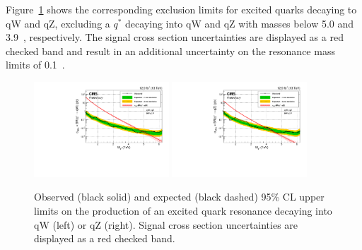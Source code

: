 \noindent Figure~\ref{fig:searchII:limitCombined_qV} shows the corresponding exclusion limits for excited quarks decaying to qW and qZ, excluding a $q^*$ decaying into qW and qZ with masses below 5.0 and 3.9~\TeV, respectively. The signal cross section uncertainties are displayed as a red checked band and result in an additional uncertainty on the resonance mass limits of 0.1~\TeV.
\begin{figure}[h!]
\centering
     \includegraphics[width=0.45\textwidth]{figures/analysis/search2/B2G-16-021/figures/limits/brazilianFlag_qW_new_combined_13TeV.pdf}
     \includegraphics[width=0.45\textwidth]{figures/analysis/search2/B2G-16-021/figures/limits/brazilianFlag_qZ_new_combined_13TeV.pdf}\\
\caption{Observed (black solid) and expected (black dashed) 95\% CL upper limits on the production of an excited quark resonance
decaying into qW (left) or qZ (right). Signal cross section uncertainties are displayed as a red checked band.}
\label{fig:searchII:limitCombined_qV}
\end{figure}
